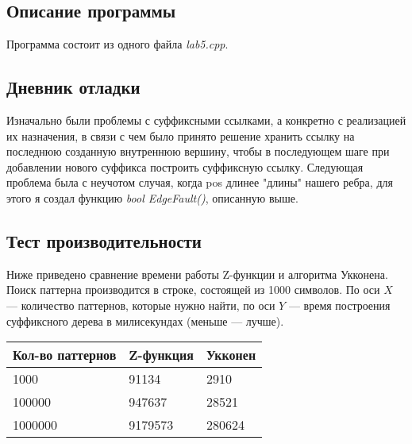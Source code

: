 \documentclass[12pt]{article}
\begin{document}
    \subsection*{Описание программы}

    Программа состоит из одного файла \textit{lab5.cpp}.

    \subsection*{Дневник отладки}

    \begin{enumerate}
    Изначально были проблемы с суффиксными ссылками, а конкретно с реализацией их назначения, в связи с чем было принято решение хранить
    ссылку на последнюю созданную внутреннюю вершину, чтобы в последующем шаге при добавлении нового суффикса построить суффиксную ссылку.
    Следующая проблема была с неучотом случая, когда pos длинее "длины" нашего ребра, для этого я создал функцию \textit{bool EdgeFault()}, описанную выше.
    \end{enumerate}


    \subsection*{Тест производительности}

    Ниже приведено сравнение времени работы Z-функции и алгоритма Укконена. Поиск паттерна производится в строке, состоящей из 1000 символов. По оси $X$ — количество паттернов, которые нужно найти, по оси $Y$ — время построения суффиксного дерева в милисекундах 
    (меньше — лучше).
    

    \begin{tabular}{ | l | l | l | }
        \hline
            Кол-во паттернов & Z-функция & Укконен \\ \hline
            1000            & 91134      & 2910       \\
            100000           & 947637      & 28521      \\
            1000000          & 9179573  & 280624    \\
        \hline
    \end{tabular}
\end{document}
